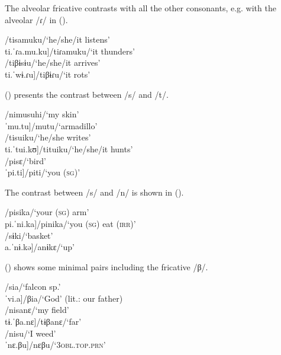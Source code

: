 The alveolar fricative contrasts with all the other consonants, e.g. with the alveolar /ɾ/ in ().
  
  \ea\label{ex:s-r}
\ea    \tab[ti.ˈsa.mu.ku]\tab /tisamuku/\tab ‘he/she/it listens’\\
    \tab{[}ti.ˈɾa.mu.ku]\tab /tiɾamuku/\tab ‘it thunders’\\
\ex   {}\tab\tab /tiβɨsɨu/\tab ‘he/she/it arrives’\\
    \tab{[}ti.ˈwɨ.ɾu]\tab\tab /tiβɨɾu/\tab ‘it rots’\\%
\z
\xe

() presents the contrast between /s/ and /t/.
 
  \ea\label{ex:s-t}
\ea    \tab[ni.ˈmu.su.hĩ]\tab /nimusuhi/\tab ‘my skin’\\
    \tab{[}ˈmu.tu]\tab\tab /mutu/\tab ‘armadillo’\\
\ex    \tab[ti.ˈsui.kʊ]\tab\tab /tisuiku/\tab ‘he/she writes’\\
    \tab{[}ti.ˈtui.kʊ]\tab\tab /tituiku/\tab ‘he/she/it hunts’\\
\ex    \tab[ˈpi.sɛ]\tab\tab /pisɛ/\tab\tab ‘bird’\\
    \tab{[}ˈpi.ti]\tab\tab\tab /piti/\tab\tab ‘you (\textsc{sg})’ \\%
\z
    \xe

The contrast between /s/ and /n/ is shown in ().

  \ea\label{ex:s-n}
\ea    \tab[pi.ˈsi.ka]\tab /pisika/\tab ‘your (\textsc{sg}) arm’\\
   \tab{[}pi.ˈni.ka]\tab /pinika/\tab ‘you (\textsc{sg}) eat (\textsc{irr})’\\
\ex   \tab[ˈsɨ.ki]\tab\tab /sɨki/\tab\tab ‘basket’\\
    \tab{[}a.ˈnɨ.kǝ]\tab /anɨkɛ/\tab ‘up’\\%
\z
\xe 
    
() shows some minimal pairs including the fricative /β/.    

  \ea\label{ex:s-b}
\ea    \tab[ˈsi.a]\tab\tab /sia/\tab\tab ‘falcon sp.’\\
    \tab{[}ˈvi.a]\tab\tab /βia/\tab\tab ‘God’ (lit.: our father) \\
\ex   \tab[ni.ˈsa.nɛ]\tab /nisanɛ/\tab ‘my field’\\
    \tab{[}tɨ.ˈβa.nɛ]\tab /tɨβanɛ/\tab ‘far’\\
\ex  \tab[ˈni.su]\tab /nisu/\tab\tab ‘I weed’\\
   \tab{[}ˈnɛ.βu]\tab /nɛβu/\tab ‘3\textsc{obl.top.prn}’\\%
\z
 \xe


